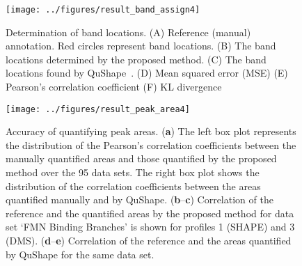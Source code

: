 \begin{figure}
\centering
\texttt{[image: ../figures/result\_band\_assign4]}
\caption{Determination of band locations. (A) Reference (manual) annotation. Red circles represent band locations. (B) The band locations determined by the proposed method. (C) The band locations found by QuShape~\citep{Karabiber2013}. (D) Mean squared error (MSE) (E) Pearson's correlation coefficient (F) KL divergence}
\label{f:band-assign}
\end{figure}

\begin{figure}
\centering
\texttt{[image: ../figures/result\_peak\_area4]}
\caption{Accuracy of quantifying peak areas. (\textbf{a}) The left box plot represents the distribution of the Pearson's correlation coefficients between the manually quantified areas and those quantified by the proposed method over the 95 data sets. The right box plot shows the distribution of the correlation coefficients between the areas quantified manually and by QuShape. (\textbf{b}--\textbf{c}) Correlation of the reference and the quantified areas by the proposed method for data set `FMN Binding Branches' is shown for profiles 1 (SHAPE) and 3 (DMS). (\textbf{d}--\textbf{e}) Correlation of the reference and the areas quantified by QuShape for the same data set.
}
\label{f:peak-area}
\end{figure}

\newcommand{\bP}{{\mathbf{P}}}


